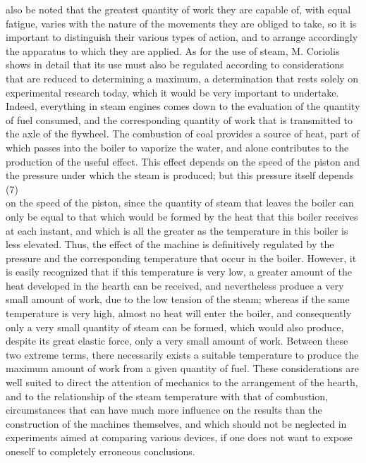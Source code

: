 \documentclass{book}
\begin{document}
also be noted that the greatest quantity of work they are capable of, with equal fatigue, varies with the nature of the movements they are obliged to take, so it is important to distinguish their various types of action, and to arrange accordingly the apparatus to which they are applied. As for the use of steam, M. Coriolis shows in detail that its use must also be regulated according to considerations that are reduced to determining a maximum, a determination that rests solely on experimental research today, which it would be very important to undertake. Indeed, everything in steam engines comes down to the evaluation of the quantity of fuel consumed, and the corresponding quantity of work that is transmitted to the axle of the flywheel. The combustion of coal provides a source of heat, part of which passes into the boiler to vaporize the water, and alone contributes to the production of the useful effect. This effect depends on the speed of the piston and the pressure under which the steam is produced; but this pressure itself depends 
\newpage
(7)\\
on the speed of the piston, since the quantity of steam that leaves the boiler can only be equal to that which would be formed by the heat that this boiler receives at each instant, and which is all the greater as the temperature in this boiler is less elevated.
Thus, the effect of the machine is definitively regulated by the pressure and the corresponding temperature that occur in the boiler. However, it is easily recognized that if this temperature is very low, a greater amount of the heat developed in the hearth can be received, and nevertheless produce a very small amount of work, due to the low tension of the steam; whereas if the same temperature is very high, almost no heat will enter the boiler, and consequently only a very small quantity of steam can be formed, which would also produce, despite its great elastic force, only a very small amount of work. Between these two extreme terms, there necessarily exists a suitable temperature to produce the maximum amount of work from a given quantity of fuel. These considerations are well suited to direct the attention of mechanics to the arrangement of the hearth, and to the relationship of the steam temperature with that of combustion, circumstances that can have much more influence on the results than the construction of the machines themselves, and which should not be neglected in experiments aimed at comparing various devices, if one does not want to expose oneself to completely erroneous conclusions.
\end{document}
